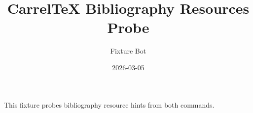 \documentclass{article}
\title{CarrelTeX Bibliography Resources Probe}
\author{Fixture Bot}
\date{2026-03-05}
\begin{document}
\maketitle

This fixture probes bibliography resource hints from both commands.
\end{document}
